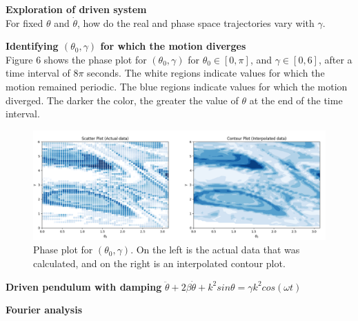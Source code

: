 \documentclass[12pt]{article}
\newenvironment{problem}[2][]{\begin{trivlist}
\item[\hskip \labelsep {\bfseries #1}\hskip \labelsep {\bfseries #2.}]}{\end{trivlist}}
\begin{document}
\begin{problem}{4}
	\textbf{Exploration of driven system} \\
	For fixed $\theta$ and $\dot{\theta}$, how do the real and phase space trajectories vary with $\gamma$.  

	\begin{figure}[ht!]
	\centering
	\begin{minipage}[b]{0.4\textwidth}
		\label{}
	\end{minipage}
	\hfill
	\begin{minipage}[b]{0.4\textwidth}
		\label{}
	\end{minipage}
	\caption{}
\end{figure}
\end{problem}

\begin{problem}{5}
	\textbf{Identifying $(\theta_{0},\gamma)$ for which the motion diverges} \\

	Figure 6 shows the phase plot for $(\theta_{0},\gamma)$ for $\theta_{0} \in [0,\pi]$, and $\gamma \in [0,6]$, after a time interval of $8\pi$ seconds.  The white regions indicate values for which the motion remained periodic. The blue regions indicate values for which the motion diverged.  The darker the color, the greater the value of $\theta$ at the end of the time interval.
\begin{figure}[h!]
	\centering
  	\includegraphics[scale=0.5]{../figures/diverge2.png}
 	\caption{Phase plot for $(\theta_{0},\gamma)$. On the left is the actual data that was calculated, and on the right is an interpolated contour plot.}
  	\label{diverge}
\end{figure}
\end{problem}

\begin{problem}{6}
	\textbf{Driven pendulum with damping} $\ddot{\theta}+2\beta\dot{\theta}+k^{2}sin\theta=\gamma k^{2}cos(\omega t)$ \\


\end{problem}

\begin{problem}{7}
	\textbf{Fourier analysis}
\end{problem}
\end{document}
